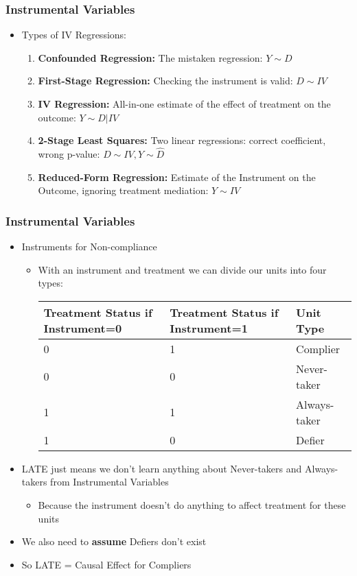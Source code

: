 \documentclass[xcolor=x11names,compress]{beamer}\usepackage[]{graphicx}\usepackage[]{color}
\renewcommand{\(}{\begin{columns}}
\renewcommand{\)}{\end{columns}}
\newcommand{\<}[1]{\begin{column}{#1}}
\renewcommand{\>}{\end{column}}
\begin{document}
\begin{frame}
\frametitle{Instrumental Variables}
\begin{itemize}
\item Types of IV Regressions:
\pause
\begin{enumerate}
\item \textbf{Confounded Regression:} The mistaken regression: $Y \sim D$
\pause
\item \textbf{First-Stage Regression:} Checking the instrument is valid: $D \sim IV$
\pause
\item \textbf{IV Regression:} All-in-one estimate of the effect of treatment on the outcome: $Y \sim D | IV$
\pause
\item \textbf{2-Stage Least Squares:} Two linear regressions: correct coefficient, wrong p-value: $D \sim IV, Y \sim \hat{D}$
\pause
\item \textbf{Reduced-Form Regression:} Estimate of the Instrument on the Outcome, ignoring treatment mediation: $Y \sim IV$
\end{enumerate}
\end{itemize}
\end{frame}

\begin{frame}
\frametitle{Instrumental Variables}
\begin{itemize}
\item Instruments for Non-compliance
\pause
\begin{itemize}
\item With an instrument and treatment we can divide our units into four types:
\begin{table}[htbp]
  \centering
    \begin{tabular}{|p{3cm}|p{3cm}|p{3cm}|}
    \hline
    \multicolumn{1}{|p{3cm}|}{\textbf{Treatment Status if Instrument=0}} & \multicolumn{1}{p{3cm}|}{\textbf{Treatment Status if Instrument=1}} & \textbf{Unit Type} \bigstrut\\
    \hline
    0     & 1     & Complier \bigstrut\\
    \hline
    0     & 0     & Never-taker \bigstrut\\
    \hline
    1     & 1     & Always-taker \bigstrut\\
    \hline
    1     & 0     & Defier \bigstrut\\
    \hline
    \end{tabular}%
  \label{tab:addlabel}%
\end{table}%
\pause
\end{itemize}
\item LATE just means we don't learn anything about Never-takers and Always-takers from Instrumental Variables
\begin{itemize}
\item Because the instrument doesn't do anything to affect treatment for these units
\pause
\end{itemize}
\item We also need to \textbf{assume} Defiers don't exist
\item So LATE = Causal Effect for Compliers 
\end{itemize}
\end{frame}
\end{document}

